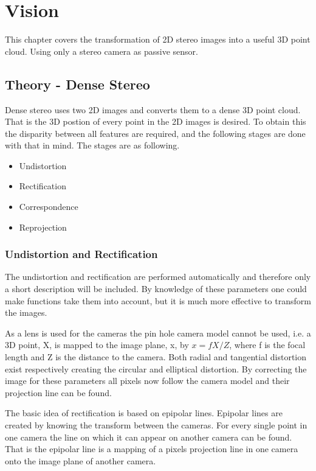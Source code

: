 \chapter{Vision}


This chapter covers the transformation of 2D stereo images into a useful 3D point cloud. Using only a stereo camera as passive sensor.

\section{Theory - Dense Stereo}

Dense stereo uses two 2D images and converts them to a dense 3D point cloud. That is the 3D postion of every point in the 2D images is desired. To obtain this the disparity between all features are required, and the following stages are done with that in mind. The stages are as following.

\begin{itemize}
  \item Undistortion
  \item Rectification
  \item Correspondence
  \item Reprojection
\end{itemize}


\subsection{Undistortion and Rectification}


The undistortion and rectification are performed automatically and therefore only a short description will be included. By knowledge of these parameters one could make functions take them into account, but it is much more effective to transform the images.

As a lens is used for the cameras the pin hole camera model cannot be used, i.e. a 3D point, X, is mapped to the image plane, x, by $ x = f X/Z $, where f is the focal length and Z is the distance to the camera. Both radial and tangential distortion exist respectively creating the circular and elliptical distortion. By correcting the image for these parameters all pixels now follow the camera model and their projection line can be found.

The basic idea of rectification is based on epipolar lines. Epipolar lines are created by knowing the transform between the cameras. For every single point in one camera the line on which it can appear on another camera can be found. That is the epipolar line is a mapping of a pixels projection line in one camera onto the image plane of another camera. 

